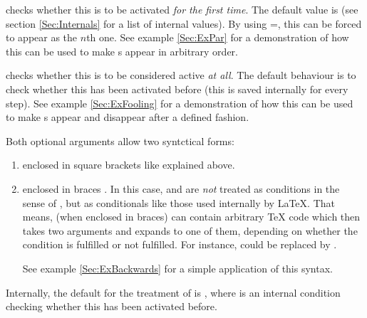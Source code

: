   \newslide

   checks whether this  is to be activated \emph{for the first time}. The
  default value is  (see section \ref{Sec:Internals}
  for a list of internal values). By using =, this  can be forced to
  appear as the $n$th one. See example \ref{Sec:ExPar} for a demonstration of how this can be used to make
  s appear in arbitrary order.
  
   checks whether this  is to be considered active \emph{at all}. The default
  behaviour is to check whether this  has been activated before (this is saved internally for every
  step). See example \ref{Sec:ExFooling} for a demonstration of how this can be used to make s appear
  and disappear after a defined fashion.
  
  Both optional arguments allow two syntctical forms: 
  \begin{enumerate}
  \item enclosed in square brackets \code{[]} like explained above.
  \item enclosed in braces \code{()}. In this case,  and  are \emph{not} treated as
    conditions in the sense of , but as conditionals like those used internally by \LaTeX. That
    means,  (when enclosed in braces) can contain arbitrary \TeX{} code which then takes two
    arguments and expands to one of them, depending on whether the condition is fulfilled or not fulfilled. For
    instance,  could be replaced by
    .

    See example \ref{Sec:ExBackwards} for a simple application of this syntax.
  \end{enumerate}

  Internally, the default for the treatment of  is , where
   is an internal condition checking whether this  has been activated before.

  \newslide

